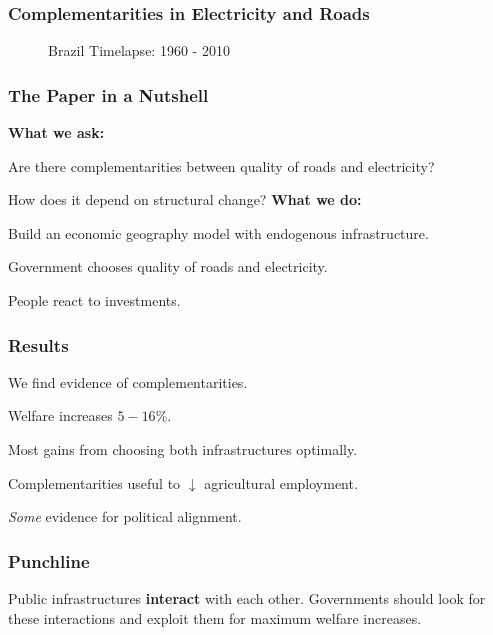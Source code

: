 \documentclass[11pt,xcolor={svgnames},aspectratio=169,usepdftitle=false]{beamer}
\let\toneitemize\itemize
\let\ttwoitemize\enditemize
\renewenvironment{itemize}{\toneitemize\addtolength{\itemsep}{1.05\baselineskip}}{\ttwoitemize}
\begin{document}
\begin{frame}
    \frametitle{Complementarities in Electricity and Roads}
    \begin{figure}
        \centering
        \caption{Brazil Timelapse: 1960 - 2010}
    \end{figure}
\end{frame}

\begin{frame}
    \frametitle{The Paper in a Nutshell}
\alert{\textbf{What we ask:}}
\begin{itemize}
    \item Are there complementarities between quality of roads and electricity?
    \item How does it depend on structural change?
\end{itemize}
\alert{\textbf{What we do:}}
\begin{itemize}
    \item Build an economic geography model with endogenous infrastructure.
    \item Government chooses quality of roads and electricity.
    \item People react to investments.
\end{itemize}
\end{frame}

\begin{frame}
    \frametitle{Results}
\begin{itemize}
    \item We find evidence of complementarities.
    \item Welfare increases $5-16\%$.
    \item Most gains from choosing \alert{both infrastructures} optimally.
    \item Complementarities useful to $\downarrow$ agricultural employment.
    \item \alert{\textit{Some}} evidence for political alignment.
\end{itemize}
\end{frame}

\begin{frame}
    \frametitle{Punchline}

\begin{block}{}
Public infrastructures \alert{\textbf{interact}} with each other. Governments should look for these interactions and exploit them for maximum welfare increases.
\end{block}

\end{frame}
\end{document}
